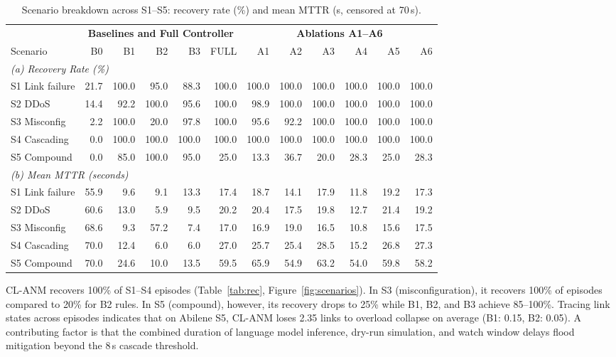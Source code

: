 \documentclass[sn-mathphys,Numbered]{sn-jnl}
\begin{document}
\begin{table}[t]\centering\footnotesize\setlength{\tabcolsep}{4pt}
\caption{Scenario breakdown across S1--S5: recovery rate (\%) and mean MTTR (s, censored at 70\,s).}\label{tab:rec}\label{tab:mttr}%
\begin{adjustbox}{max width=\textwidth,center}
\begin{tabular}{lrrrrr@{\hspace{12pt}}rrrrrr}
\toprule
& \multicolumn{5}{c}{\textbf{Baselines and Full Controller}} & \multicolumn{6}{c}{\textbf{Ablations A1--A6}} \\
\cmidrule(lr){2-6}\cmidrule(lr){7-12}
Scenario & B0 & B1 & B2 & B3 & FULL & A1 & A2 & A3 & A4 & A5 & A6 \\
\midrule
\multicolumn{12}{l}{\textit{(a) Recovery Rate (\%)}} \\
S1 Link failure & 21.7 & 100.0 & 95.0 & 88.3 & 100.0 & 100.0 & 100.0 & 100.0 & 100.0 & 100.0 & 100.0 \\
S2 DDoS & 14.4 & 92.2 & 100.0 & 95.6 & 100.0 & 98.9 & 100.0 & 100.0 & 100.0 & 100.0 & 100.0 \\
S3 Misconfig & 2.2 & 100.0 & 20.0 & 97.8 & 100.0 & 95.6 & 92.2 & 100.0 & 100.0 & 100.0 & 100.0 \\
S4 Cascading & 0.0 & 100.0 & 100.0 & 100.0 & 100.0 & 100.0 & 100.0 & 100.0 & 100.0 & 100.0 & 100.0 \\
S5 Compound & 0.0 & 85.0 & 100.0 & 95.0 & 25.0 & 13.3 & 36.7 & 20.0 & 28.3 & 25.0 & 28.3 \\
\midrule
\multicolumn{12}{l}{\textit{(b) Mean MTTR (seconds)}} \\
S1 Link failure & 55.9 & 9.6 & 9.1 & 13.3 & 17.4 & 18.7 & 14.1 & 17.9 & 11.8 & 19.2 & 17.3 \\
S2 DDoS & 60.6 & 13.0 & 5.9 & 9.5 & 20.2 & 20.4 & 17.5 & 19.8 & 12.7 & 21.4 & 19.2 \\
S3 Misconfig & 68.6 & 9.3 & 57.2 & 7.4 & 17.0 & 16.9 & 19.0 & 16.5 & 10.8 & 15.6 & 17.5 \\
S4 Cascading & 70.0 & 12.4 & 6.0 & 6.0 & 27.0 & 25.7 & 25.4 & 28.5 & 15.2 & 26.8 & 27.3 \\
S5 Compound & 70.0 & 24.6 & 10.0 & 13.5 & 59.5 & 65.9 & 54.9 & 63.2 & 54.0 & 59.8 & 58.2 \\
\bottomrule
\end{tabular}
\end{adjustbox}
\end{table}

CL-ANM recovers 100\% of S1--S4 episodes (Table~\ref{tab:rec}, Figure~\ref{fig:scenarios}). In S3 (misconfiguration), it recovers 100\% of episodes compared to 20\% for B2 rules. In S5 (compound), however, its recovery drops to 25\% while B1, B2, and B3 achieve 85--100\%. Tracing link states across episodes indicates that on Abilene S5, CL-ANM loses 2.35 links to overload collapse on average (B1: 0.15, B2: 0.05). A contributing factor is that the combined duration of language model inference, dry-run simulation, and watch window delays flood mitigation beyond the 8\,s cascade threshold.
\end{document}
